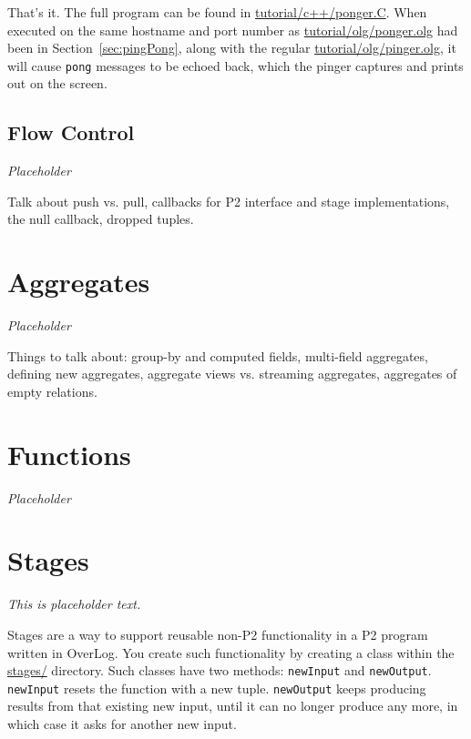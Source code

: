 \documentclass{article}
\begin{document}
That's it. The full program can be found in
\url{tutorial/c++/ponger.C}. When executed on the same hostname and port
number as \url{tutorial/olg/ponger.olg} had been in
Section~\ref{sec:pingPong}, along with the regular
\url{tutorial/olg/pinger.olg}, it will cause \lstinline$pong$ messages
to be echoed back, which the pinger captures and prints out on the
screen.




\subsection{Flow Control}

\emph{Placeholder}

Talk about push vs. pull, callbacks for P2 interface and stage
implementations, the null callback, dropped tuples.













\section{Aggregates}
\label{sec:aggregates}

\emph{Placeholder}

Things to talk about: group-by and computed fields, multi-field
aggregates, defining new aggregates, aggregate views vs. streaming
aggregates, aggregates of empty relations.



\section{Functions}
\label{sec:functions}

\emph{Placeholder}


\section{Stages}

\emph{This is placeholder text.}

Stages are a way to support reusable non-P2 functionality in a P2
program written in OverLog. You create such functionality by creating a
class within the \url{stages/} directory. Such classes have two methods:
\texttt{newInput} and \texttt{newOutput}. \texttt{newInput} resets the
function with a new tuple. \texttt{newOutput} keeps producing results
from that existing new input, until it can no longer produce any more,
in which case it asks for another new input. 
\end{document}

